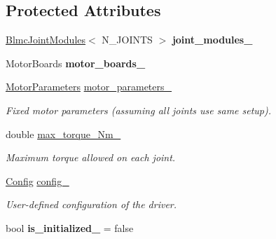 \subsection*{Protected Attributes}
\begin{DoxyCompactItemize}
\item 
\mbox{\label{classblmc__robots_1_1NJointBlmcRobotDriver_a17f32687708f95c1160ecb708d429ccd}} 
\hyperlink{classblmc__robots_1_1BlmcJointModules}{Blmc\+Joint\+Modules}$<$ N\+\_\+\+J\+O\+I\+N\+TS $>$ {\bfseries joint\+\_\+modules\+\_\+}
\item 
\mbox{\label{classblmc__robots_1_1NJointBlmcRobotDriver_ad760af5444951e4ce505e45b4e13d4ca}} 
Motor\+Boards {\bfseries motor\+\_\+boards\+\_\+}
\item 
\mbox{\label{classblmc__robots_1_1NJointBlmcRobotDriver_ad5e1875908bb62b2f014c3f8dfce969d}} 
\hyperlink{structblmc__robots_1_1MotorParameters}{Motor\+Parameters} \hyperlink{classblmc__robots_1_1NJointBlmcRobotDriver_ad5e1875908bb62b2f014c3f8dfce969d}{motor\+\_\+parameters\+\_\+}
\begin{DoxyCompactList}\small\item\em Fixed motor parameters (assuming all joints use same setup). \end{DoxyCompactList}\item 
\mbox{\label{classblmc__robots_1_1NJointBlmcRobotDriver_a62f708a1406f8dfb68361c5698a5559b}} 
double \hyperlink{classblmc__robots_1_1NJointBlmcRobotDriver_a62f708a1406f8dfb68361c5698a5559b}{max\+\_\+torque\+\_\+\+Nm\+\_\+}
\begin{DoxyCompactList}\small\item\em Maximum torque allowed on each joint. \end{DoxyCompactList}\item 
\hyperlink{structblmc__robots_1_1NJointBlmcRobotDriver_1_1Config}{Config} \hyperlink{classblmc__robots_1_1NJointBlmcRobotDriver_a5af27a320384e0189725ee1b13edc314}{config\+\_\+}
\begin{DoxyCompactList}\small\item\em User-\/defined configuration of the driver. \end{DoxyCompactList}\item 
\mbox{\label{classblmc__robots_1_1NJointBlmcRobotDriver_af11037c8c3395fcde191037c82ba6c0a}} 
bool {\bfseries is\+\_\+initialized\+\_\+} = false
\end{DoxyCompactItemize}



